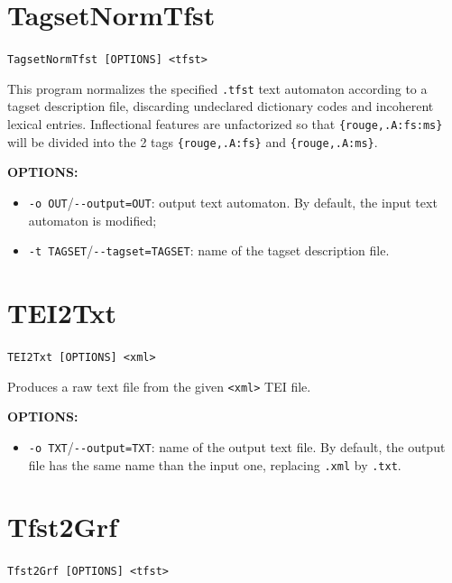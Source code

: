 \section{TagsetNormTfst} \verb+TagsetNormTfst [OPTIONS] <tfst>+

\bigskip
\noindent This program normalizes the specified \verb+.tfst+ text automaton according
to a tagset description file, discarding undeclared dictionary codes
and incoherent lexical entries. Inflectional features are unfactorized so 
that \verb+{rouge,.A:fs:ms}+ will be divided into the 2 tags \verb+{rouge,.A:fs}+ 
and \verb+{rouge,.A:ms}+.

\bigskip
\noindent \textbf{OPTIONS:}
\begin{itemize}
  \item \verb+-o OUT+/\verb+--output=OUT+: output text automaton. By default,
  the input text automaton is modified;
  \item \verb+-t TAGSET+/\verb+--tagset=TAGSET+: name of the tagset description
  file.
\end{itemize}







\section{TEI2Txt} 
\verb+TEI2Txt [OPTIONS] <xml>+

\bigskip
\noindent Produces a raw text file from the given \verb+<xml>+ TEI file.

\bigskip
\noindent \textbf{OPTIONS:}
\begin{itemize}
  \item \verb+-o TXT+/\verb+--output=TXT+: name of the output text file.
  By default, the output file has the same name than the input one, 
  replacing \verb+.xml+ by \verb+.txt+.
\end{itemize}







\section{Tfst2Grf}
\verb+Tfst2Grf [OPTIONS] <tfst>+

